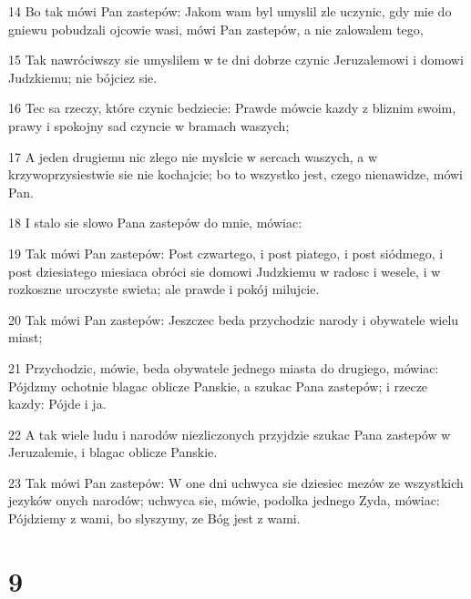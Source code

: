 \par 14 Bo tak mówi Pan zastepów: Jakom wam byl umyslil zle uczynic, gdy mie do gniewu pobudzali ojcowie wasi, mówi Pan zastepów, a nie zalowalem tego,
\par 15 Tak nawróciwszy sie umyslilem w te dni dobrze czynic Jeruzalemowi i domowi Judzkiemu; nie bójciez sie.
\par 16 Tec sa rzeczy, które czynic bedziecie: Prawde mówcie kazdy z bliznim swoim, prawy i spokojny sad czyncie w bramach waszych;
\par 17 A jeden drugiemu nic zlego nie myslcie w sercach waszych, a w krzywoprzysiestwie sie nie kochajcie; bo to wszystko jest, czego nienawidze, mówi Pan.
\par 18 I stalo sie slowo Pana zastepów do mnie, mówiac:
\par 19 Tak mówi Pan zastepów: Post czwartego, i post piatego, i post siódmego, i post dziesiatego miesiaca obróci sie domowi Judzkiemu w radosc i wesele, i w rozkoszne uroczyste swieta; ale prawde i pokój milujcie.
\par 20 Tak mówi Pan zastepów: Jeszczec beda przychodzic narody i obywatele wielu miast;
\par 21 Przychodzic, mówie, beda obywatele jednego miasta do drugiego, mówiac: Pójdzmy ochotnie blagac oblicze Panskie, a szukac Pana zastepów; i rzecze kazdy: Pójde i ja.
\par 22 A tak wiele ludu i narodów niezliczonych przyjdzie szukac Pana zastepów w Jeruzalemie, i blagac oblicze Panskie.
\par 23 Tak mówi Pan zastepów: W one dni uchwyca sie dziesiec mezów ze wszystkich jezyków onych narodów; uchwyca sie, mówie, podolka jednego Zyda, mówiac: Pójdziemy z wami, bo slyszymy, ze Bóg jest z wami.

\chapter{9}

